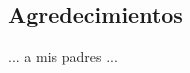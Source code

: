 \sloppy
\newpage
\thispagestyle{empty}

\begin{center}
\section*{Agredecimientos}
... a mis padres ...
\end{center}
